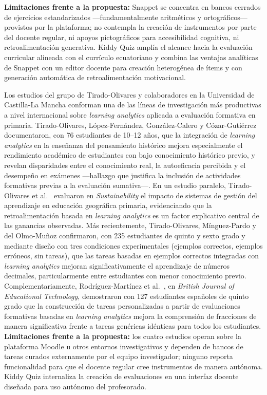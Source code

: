\textbf{Limitaciones frente a la propuesta:} Snappet se concentra en bancos cerrados de ejercicios estandarizados ---fundamentalmente aritméticos y ortográficos--- provistos por la plataforma; no contempla la creación de instrumentos por parte del docente regular, ni apoyos pictográficos para accesibilidad cognitiva, ni retroalimentación generativa. Kiddy Quiz amplía el alcance hacia la evaluación curricular alineada con el currículo ecuatoriano y combina las ventajas analíticas de Snappet con un editor docente para creación heterogénea de ítems y con generación automática de retroalimentación motivacional.

Los estudios del grupo de Tirado-Olivares y colaboradores en la Universidad de Castilla-La Mancha conforman una de las líneas de investigación más productivas a nivel internacional sobre \textit{learning analytics} aplicada a evaluación formativa en primaria. Tirado-Olivares, López-Fernández, González-Calero y Cózar-Gutiérrez \cite{tirado2024analytics} documentaron, con 76 estudiantes de 10--12 años, que la integración de \textit{learning analytics} en la enseñanza del pensamiento histórico mejora especialmente el rendimiento académico de estudiantes con bajo conocimiento histórico previo, y revelan disparidades entre el conocimiento real, la autoeficacia percibida y el desempeño en exámenes ---hallazgo que justifica la inclusión de actividades formativas previas a la evaluación sumativa---. En un estudio paralelo, Tirado-Olivares et al.\ \cite{tirado2024lms} evaluaron en \textit{Sustainability} el impacto de sistemas de gestión del aprendizaje en educación geográfica primaria, evidenciando que la retroalimentación basada en \textit{learning analytics} es un factor explicativo central de las ganancias observadas. Más recientemente, Tirado-Olivares, Mínguez-Pardo y del Olmo-Muñoz \cite{tirado2025bridge} confirmaron, con 235 estudiantes de quinto y sexto grado y mediante diseño con tres condiciones experimentales (ejemplos correctos, ejemplos erróneos, sin tareas), que las tareas basadas en ejemplos correctos integradas con \textit{learning analytics} mejoran significativamente el aprendizaje de números decimales, particularmente entre estudiantes con menor conocimiento previo. Complementariamente, Rodríguez-Martínez et al.\ \cite{rodriguez2023personalised}, en \textit{British Journal of Educational Technology}, demostraron con 127 estudiantes españoles de quinto grado que la construcción de tareas personalizadas a partir de evaluaciones formativas basadas en \textit{learning analytics} mejora la comprensión de fracciones de manera significativa frente a tareas genéricas idénticas para todos los estudiantes. \textbf{Limitaciones frente a la propuesta:} los cuatro estudios operan sobre la plataforma Moodle u otros entornos investigativos y dependen de bancos de tareas curados externamente por el equipo investigador; ninguno reporta funcionalidad para que el docente regular cree instrumentos de manera autónoma. Kiddy Quiz internaliza la creación de evaluaciones en una interfaz docente diseñada para uso autónomo del profesorado.

